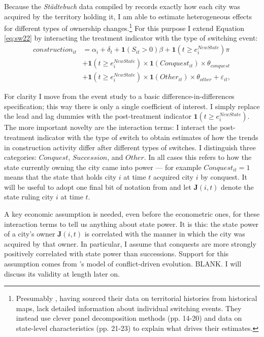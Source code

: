 \documentclass[11pt, a4paper]{article}
\begin{document}
Because the \textit{Städtebuch} data compiled by \cite{pt2} records exactly how each city was acquired by the territory holding it, I am able to estimate heterogeneous effects for different types of ownership changes.\footnote
{
Presumably \cite{schoenholzer2022}, having sourced their data on territorial histories from historical maps, lack detailed information about individual switching events. They instead use clever panel decomposition methods (pp. 14-20) and data on state-level characteristics (pp. 21-23) to explain what drives their estimates.
}
For this purpose I extend Equation \eqref{eq:sw22} by interacting the treatment indicator with the type of switching event:
\begin{equation}
\label{eq:baseline}
\begin{split}
    construction_{it} &= \alpha_i + \delta_t + \mathbf{1}(S_{it} > 0)\beta +
    \mathbf{1}(t \ge e^{NewState}_i)\pi \\
    &+ \mathbf{1}(t \ge e^{NewState}_i) \times
    \mathbf{1}(Conquest_{it}) \times \theta_{conquest} \\
    &+ \mathbf{1}(t \ge e^{NewState}_i) \times
    \mathbf{1}(Other_{it}) \times \theta_{other} + \varepsilon_{it},
\end{split}
\end{equation}

For clarity I move from the event study to a basic difference-in-differences specification; this way there is only a single coefficient of interest. I simply replace the lead and lag dummies with the post-treatment indicator $\mathbf{1}(t \ge e^{NewState}_i)$. The more important novelty are the interaction terms: I interact the post-treatment indicator with the type of switch to obtain estimates of how the trends in construction activity differ after different types of switches. I distinguish three categories: $Conquest$, $Succession$, and $Other$. In all cases this refers to how the state currently owning the city came into power --- for example $Conquest_{it} = 1$ means that the state that holds city $i$ at time $t$ acquired city $i$ by conquest. It will be useful to adopt one final bit of notation from \cite{schoenholzer2022} and let $\mathbf{J}(i, t)$ denote the state ruling city $i$ at time $t$.

A key economic assumption is needed, even before the econometric ones, for these interaction terms to tell us anything about state power. It is this: the state power of a city's owner $\mathbf{J}(i, t)$ is correlated with the manner in which the city was acquired by that owner. In particular, I assume that conquests are more strongly positively correlated with state power than successions. Support for this assumption comes from \cite{levine2021}'s model of conflict-driven evolution. BLANK. I will discuss its validity at length later on.
\end{document}
